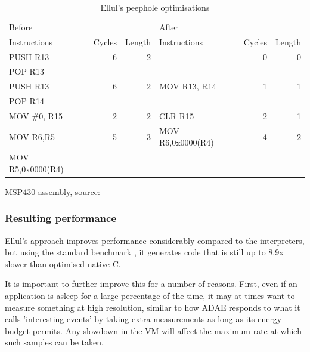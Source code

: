 \begin{table}
\caption{Ellul's peephole optimisations}
\label{tbl-ellul-peephole}
    \begin{threeparttable}
    \begin{tabular}{lrrlrr} %
    \toprule
    Before            &        &        & After             &        & \\
    Instructions      & Cycles & Length & Instructions      & Cycles & Length \\
    \midrule
    \midrule
    PUSH R13          & 6      & 2      &                   & 0      & 0 \\
    POP R13           &        &        &                   &        & \\
    \midrule
    PUSH R13          & 6      & 2      & MOV R13, R14      & 1      & 1 \\
    POP R14           &        &        &                   &        & \\
    \midrule
    MOV \#0, R15      & 2      & 2      & CLR R15           & 2      & 1 \\
    \midrule
    MOV R6,R5         & 5      & 3      & MOV R6,0x0000(R4) & 4      & 2 \\
    MOV R5,0x0000(R4) &        &        &                   &        & \\
    \bottomrule
    \end{tabular}
    \begin{tablenotes}
    \item MSP430 assembly, source: \cite{Ellul:2012thesis}
    \end{tablenotes}
    \end{threeparttable}
\end{table}

\subsubsection{Resulting performance}
Ellul's approach improves performance considerably compared to the interpreters, but using the standard  benchmark \cite{coremark}, it generates code that is still up to 8.9x slower than optimised native C.

It is important to further improve this for a number of reasons. First, even if an application is asleep for a large percentage of the time, it may at times want to measure something at high resolution, similar to how ADAE \cite{Chang:2010ek} responds to what it calls 'interesting events' by taking extra measurements as long as its energy budget permits. Any slowdown in the VM will affect the maximum rate at which such samples can be taken.

